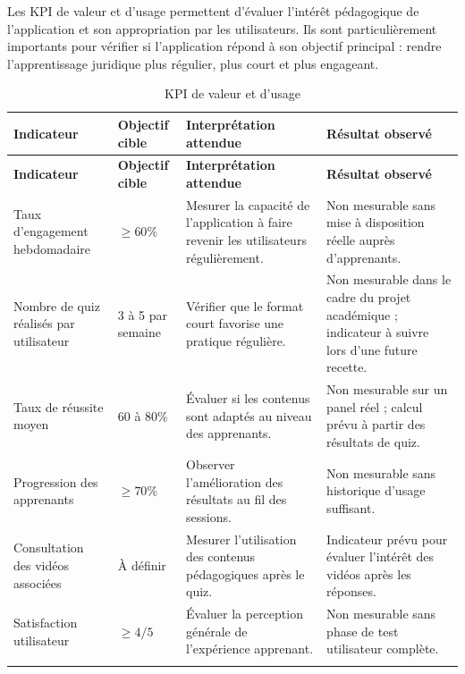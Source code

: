 Les KPI de valeur et d'usage permettent d'évaluer l'intérêt pédagogique de l'application et son appropriation par les utilisateurs. 
Ils sont particulièrement importants pour vérifier si l'application répond à son objectif principal : rendre l'apprentissage juridique plus régulier, plus court et plus engageant.

\begin{longtable}{|p{4.2cm}|p{3cm}|p{4.2cm}|p{3cm}|}
\hline
\rowcolor{accentGreen!15}
\textbf{Indicateur} & \textbf{Objectif cible} & \textbf{Interprétation attendue} & \textbf{Résultat observé} \\
\hline
\endfirsthead

\hline
\rowcolor{accentGreen!15}
\textbf{Indicateur} & \textbf{Objectif cible} & \textbf{Interprétation attendue} & \textbf{Résultat observé} \\
\hline
\endhead

Taux d'engagement hebdomadaire 
& $\geq 60\%$ 
& Mesurer la capacité de l'application à faire revenir les utilisateurs régulièrement. 
& Non mesurable sans mise à disposition réelle auprès d'apprenants. \\
\hline

Nombre de quiz réalisés par utilisateur 
& 3 à 5 par semaine 
& Vérifier que le format court favorise une pratique régulière. 
& Non mesurable dans le cadre du projet académique ; indicateur à suivre lors d'une future recette. \\
\hline

Taux de réussite moyen 
& 60 à 80\% 
& Évaluer si les contenus sont adaptés au niveau des apprenants. 
& Non mesurable sur un panel réel ; calcul prévu à partir des résultats de quiz. \\
\hline

Progression des apprenants 
& $\geq 70\%$ 
& Observer l'amélioration des résultats au fil des sessions. 
& Non mesurable sans historique d'usage suffisant. \\
\hline

Consultation des vidéos associées 
& À définir 
& Mesurer l'utilisation des contenus pédagogiques après le quiz. 
& Indicateur prévu pour évaluer l'intérêt des vidéos après les réponses. \\
\hline

Satisfaction utilisateur 
& $\geq 4/5$ 
& Évaluer la perception générale de l'expérience apprenant. 
& Non mesurable sans phase de test utilisateur complète. \\
\hline

\caption{KPI de valeur et d'usage}
\label{tab:kpi-valeur-usage}
\end{longtable}

